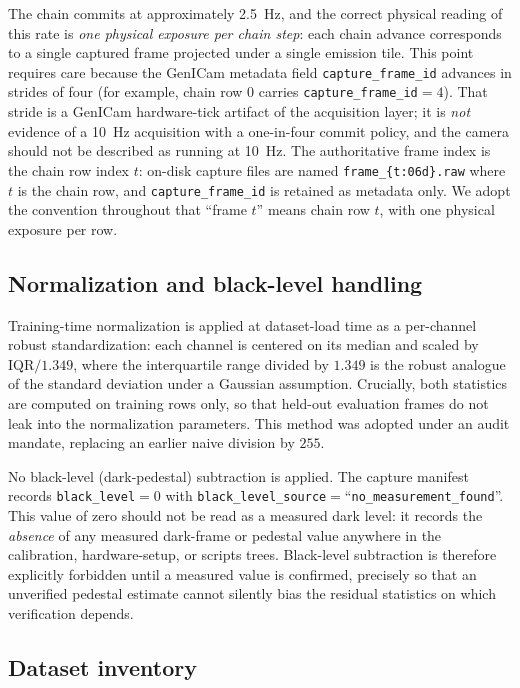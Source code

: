 The chain commits at approximately \SI{2.5}{\hertz}, and the correct physical reading of this rate is \emph{one physical exposure per chain step}: each chain advance corresponds to a single captured frame projected under a single emission tile. This point requires care because the GenICam metadata field \texttt{capture\_frame\_id} advances in strides of four (for example, chain row $0$ carries \texttt{capture\_frame\_id}${=}4$). That stride is a GenICam hardware-tick artifact of the acquisition layer; it is \emph{not} evidence of a \SI{10}{\hertz} acquisition with a one-in-four commit policy, and the camera should not be described as running at \SI{10}{\hertz}. The authoritative frame index is the chain row index $t$: on-disk capture files are named \texttt{frame\_\{t:06d\}.raw} where $t$ is the chain row, and \texttt{capture\_frame\_id} is retained as metadata only. We adopt the convention throughout that ``frame $t$'' means chain row $t$, with one physical exposure per row.

\subsection{Normalization and black-level handling}
\label{sec:hardware:norm}

Training-time normalization is applied at dataset-load time as a per-channel robust standardization: each channel is centered on its median and scaled by $\mathrm{IQR}/1.349$, where the interquartile range divided by $1.349$ is the robust analogue of the standard deviation under a Gaussian assumption. Crucially, both statistics are computed on training rows only, so that held-out evaluation frames do not leak into the normalization parameters. This method was adopted under an audit mandate, replacing an earlier naive division by $255$.

No black-level (dark-pedestal) subtraction is applied. The capture manifest records \texttt{black\_level}${=}0$ with \texttt{black\_level\_source}${=}$``\texttt{no\_measurement\_found}''. This value of zero should not be read as a measured dark level: it records the \emph{absence} of any measured dark-frame or pedestal value anywhere in the calibration, hardware-setup, or scripts trees. Black-level subtraction is therefore explicitly forbidden until a measured value is confirmed, precisely so that an unverified pedestal estimate cannot silently bias the residual statistics on which verification depends.

\subsection{Dataset inventory}
\label{sec:hardware:dataset}

